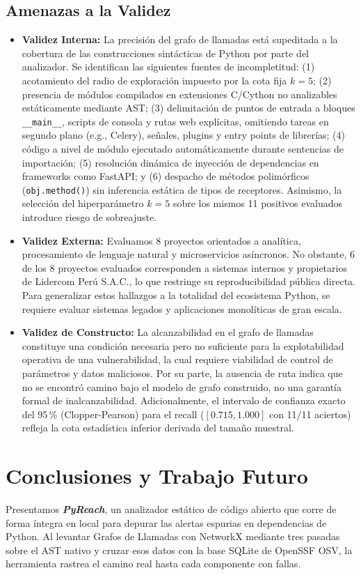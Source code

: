 \documentclass[conference]{IEEEtran}
\newcommand{\pydunder}[1]{\texttt{\_\_#1\_\_}}
\begin{document}
\subsection{Amenazas a la Validez}
\begin{itemize}
    \item \textbf{Validez Interna:} La precisión del grafo de llamadas está supeditada a la cobertura de las construcciones sintácticas de Python por parte del analizador. Se identifican las siguientes fuentes de incompletitud: (1) acotamiento del radio de exploración impuesto por la cota fija $k=5$; (2) presencia de módulos compilados en extensiones C/Cython no analizables estáticamente mediante AST; (3) delimitación de puntos de entrada a bloques \pydunder{main}, scripts de consola y rutas web explícitas, omitiendo tareas en segundo plano (e.g., Celery), señales, plugins y entry points de librerías; (4) código a nivel de módulo ejecutado automáticamente durante sentencias de importación; (5) resolución dinámica de inyección de dependencias en frameworks como FastAPI; y (6) despacho de métodos polimórficos (\texttt{obj.method()}) sin inferencia estática de tipos de receptores. Asimismo, la selección del hiperparámetro $k=5$ sobre los mismos 11 positivos evaluados introduce riesgo de sobreajuste.
    \item \textbf{Validez Externa:} Evaluamos 8 proyectos orientados a analítica, procesamiento de lenguaje natural y microservicios asíncronos. No obstante, 6 de los 8 proyectos evaluados corresponden a sistemas internos y propietarios de Lidercom Perú S.A.C., lo que restringe su reproducibilidad pública directa. Para generalizar estos hallazgos a la totalidad del ecosistema Python, se requiere evaluar sistemas legados y aplicaciones monolíticas de gran escala.
    \item \textbf{Validez de Constructo:} La alcanzabilidad en el grafo de llamadas constituye una condición necesaria pero no suficiente para la explotabilidad operativa de una vulnerabilidad, la cual requiere viabilidad de control de parámetros y datos maliciosos. Por su parte, la ausencia de ruta indica que no se encontró camino bajo el modelo de grafo construido, no una garantía formal de inalcanzabilidad. Adicionalmente, el intervalo de confianza exacto del 95\,\% (Clopper-Pearson) para el recall ($[0.715, 1.000]$ con 11/11 aciertos) refleja la cota estadística inferior derivada del tamaño muestral.
\end{itemize}

\section{Conclusiones y Trabajo Futuro}
Presentamos \textbf{\textit{PyReach}}, un analizador estático de código abierto que corre de forma íntegra en local para depurar las alertas espurias en dependencias de Python. Al levantar Grafos de Llamadas con NetworkX mediante tres pasadas sobre el AST nativo y cruzar esos datos con la base SQLite de OpenSSF OSV, la herramienta rastrea el camino real hasta cada componente con fallas.
\end{document}
